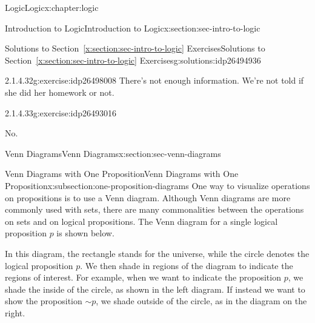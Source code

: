 \documentclass[twoside,10pt,]{book}
\newcommand{\xreffont}{\relax}
\numberwithin{equation}{section}
\begin{document}
\begin{chapterptx}{Logic}{}{Logic}{}{}{x:chapter:logic}
\begin{sectionptx}{Introduction to Logic}{}{Introduction to Logic}{}{}{x:section:sec-intro-to-logic}
\begin{solutions-subsection}{Solutions to Section~{\xreffont\ref*{x:section:sec-intro-to-logic}} Exercises}{}{Solutions to Section~{\xreffont\ref*{x:section:sec-intro-to-logic}} Exercises}{}{}{g:solutions:idp26494936}
\begin{exercisegroup}
\begin{divisionsolutioneg}{2.1.4.32}{}{g:exercise:idp26498008}
\noindent\hypertarget{g:solution:idp26494168-main}{}There's not enough information.  We're not told if she did her homework or not.\end{divisionsolutioneg}%
\begin{divisionsolutioneg}{2.1.4.33}{}{g:exercise:idp26493016}%
\par\smallskip%
\noindent\hypertarget{g:solution:idp26493528-main}{}No.\end{divisionsolutioneg}%
\end{exercisegroup}
\par\medskip\noindent
\end{solutions-subsection}
\end{sectionptx}
%
%
\typeout{************************************************}
\typeout{************************************************}
%
\begin{sectionptx}{Venn Diagrams}{}{Venn Diagrams}{}{}{x:section:sec-venn-diagrams}
%
%
\typeout{************************************************}
\typeout{************************************************}
%
\begin{subsectionptx}{Venn Diagrams with One Proposition}{}{Venn Diagrams with One Proposition}{}{}{x:subsection:one-proposition-diagrams}
One way to visualize operations on propositions is to use a Venn diagram.  Although Venn diagrams are more commonly used with sets, there are many commonalities between the operations on sets and on logical propositions.  The Venn diagram for a single logical proposition \(p\) is shown below.%
\par
\begin{image}{0.3}{0.4}{0.3}%
%
\end{image}%
%
\par
In this diagram, the rectangle stands for the universe, while the circle denotes the logical proposition \(p\).  We then shade in regions of the diagram to indicate the regions of interest.  For example, when we want to indicate the proposition \(p\), we shade the inside of the circle, as shown in the left diagram.  If instead we want to show the proposition \(\sim\!{p}\), we shade outside of the circle, as in the diagram on the right.%
\par

\end{subsectionptx}
\end{sectionptx}
\end{chapterptx}
\end{document}
